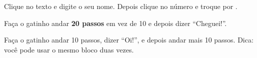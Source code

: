 \begin{solucao}
Clique no texto  e digite o seu nome. Depois clique no número  e troque por .
\begin{pilha}
\end{pilha}
\end{solucao}

\begin{exercicio}
Faça o gatinho andar \textbf{20 passos} em vez de 10 e depois dizer ``Cheguei!''.
\end{exercicio}

\begin{solucao}
\begin{pilha}
\end{pilha}
\end{solucao}

\begin{desafio}
Faça o gatinho andar 10 passos, dizer ``Oi!'', e depois andar mais 10 passos. Dica: você pode usar o mesmo bloco  duas vezes.
\end{desafio}

\begin{solucao}
\begin{pilha}
\end{pilha}
\end{solucao}
